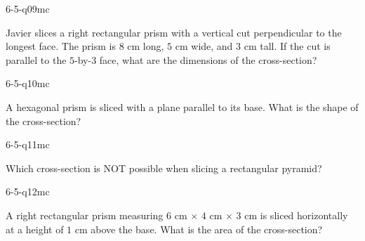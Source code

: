 \begin{practiceQuestion}{6-5-q09}{mc}
\begin{questionText}
Javier slices a right rectangular prism with a vertical cut perpendicular to the longest face. The prism is $8$ cm long, $5$ cm wide, and $3$ cm tall. If the cut is parallel to the $5$-by-$3$ face, what are the dimensions of the cross-section?
\end{questionText}
\end{practiceQuestion}

\begin{practiceQuestion}{6-5-q10}{mc}
\begin{questionText}
A hexagonal prism is sliced with a plane parallel to its base. What is the shape of the cross-section?
\end{questionText}
\end{practiceQuestion}

\begin{practiceQuestion}{6-5-q11}{mc}
\begin{questionText}
Which cross-section is NOT possible when slicing a rectangular pyramid?
\end{questionText}
\end{practiceQuestion}

\begin{practiceQuestion}{6-5-q12}{mc}
\begin{questionText}
A right rectangular prism measuring $6$ cm $\times$ $4$ cm $\times$ $3$ cm is sliced horizontally at a height of $1$ cm above the base. What is the area of the cross-section?
\end{questionText}
\end{practiceQuestion}


